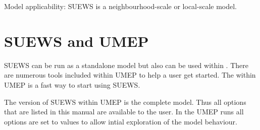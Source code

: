 \documentclass[letterpaper,10pt,english]{sphinxmanual}
\begin{document}
Model applicability: SUEWS is a neighbourhood-scale or local-scale
model.


\chapter{SUEWS and UMEP}
\label{\detokenize{suews-and-umep:suews-and-umep}}\label{\detokenize{suews-and-umep::doc}}
SUEWS can be run as a standalone model but also can be used within
. There are numerous
tools included within UMEP to help a user get started. The 
within UMEP is a fast way to start using SUEWS.

The version of SUEWS within UMEP is the complete model. Thus all options
that are listed in this manual are available to the user. In the UMEP
runs all options are set to values to allow intial exploration of the
model behaviour.
\end{document}
